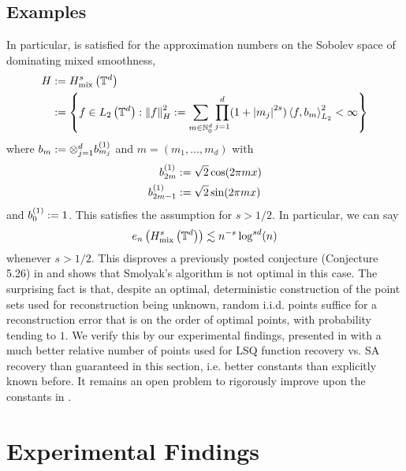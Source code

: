 \documentclass[12pt, oneside]{amsart}
\theoremstyle{definition}
\theoremstyle{remark}
\numberwithin{equation}{section}
\begin{document}
\subsection*{Examples}
In particular,  is satisfied for the 
approximation numbers on the Sobolev space of dominating mixed smoothness, 
\begin{align*}
    H &\defn H_{\text{mix}}^s\left(\T^d\right)\\
    &\defn \set{f \in L_2\left(\T^d\right) : \norm[H]{f}^2 \defn \sum_{m \in 
    \N_0^d} \prod_{j=1}^d (1+\abs{m_j}^{2s}) \inner{f}{b_m}^2_{L_2} < \infty}
\end{align*}
where \(b_m \defn \otimes_{j=1}^d b_{m_j}^{(1)}\) and \(m = (m_1, \dots, m_d)\) with \begin{align*}
    b_{2m}^{(1)} &\defn \sqrt{2}\cos(2\pi m x)\\
    b_{2m-1}^{(1)} &\defn \sqrt{2}\sin(2\pi m x)
\end{align*}
and \(b_0^{(1)} \defn 1\). This satisfies the assumption for \(s > 1/2\). In 
particular, we can say
\begin{equation}\label{eq:conclusio}
    e_n\left( H_{\text{mix}}^s\left(\T^d\right) \right) \lesssim n^{-s}\log^{sd}(n)
\end{equation}
whenever \(s > 1/2\). This disproves a previously posted conjecture (Conjecture 
5.26) in \cite{Dung_Temlyakov_Ullrich_2018} and shows that Smolyak's algorithm 
is not optimal in this case. The surprising fact is that, despite an optimal, 
deterministic construction of the point sets used for reconstruction being 
unknown, random i.i.d. points suffice for a reconstruction error that is on the 
order of optimal points, with probability tending to \(1\). We verify this by 
our experimental findings, presented in  with a 
much better relative number of points used for LSQ function recovery vs. SA 
recovery than guaranteed in this section, i.e. better constants than explicitly 
known before. It remains an open problem to rigorously improve upon the 
constants in .

\section{Experimental Findings}\label{sec:experimentalFindings}


\end{document}
